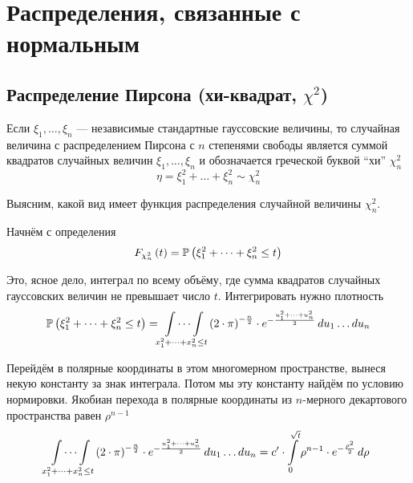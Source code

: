 \section{Распределения, связанные с нормальным}

\subsection{Распределение Пирсона (хи-квадрат, $\chi^2$)}

\begin{definition}
    Если $\xi_1, \dots, \xi_n$ --- независимые стандартные гауссовские величины,
    то случайная величина с распределением Пирсона с $n$ степенями свободы
    является суммой квадратов случайных величин $\xi_1, \dots, \xi_n$ и
    обозначается греческой буквой ``хи'' $\chi_n^2$
    $$\eta = \xi_1^2 + \dots + \xi_n^2 \sim \chi_n^2$$
\end{definition}

Выясним, какой вид имеет функция распределения случайной величины $\chi_n^2$.

Начнём с определения
\begin{align*}
    F_{\chi_n^2}\left(t\right)
    = \mathbb{P}\left( \xi_1^2 + \dots + \xi_n^2 \le t \right)
\end{align*}

Это, ясное дело, интеграл по всему объёму, где сумма квадратов случайных
гауссовских величин не превышает число $t$. Интегрировать нужно плотность
\begin{align*}
    \mathbb{P}\left( \xi_1^2 + \dots + \xi_n^2 \le t \right)
    = \idotsint\limits_{x_1^2 + \dots + x_n^2 \le t}
        \left( 2 \cdot \pi \right)^{- \frac{n}{2}}
        \cdot e^{- \frac{u_1^2 + \dots + u_n^2}{2}}
        \, du_1 \dots du_n
\end{align*}

Перейдём в полярные координаты в этом многомерном пространстве, вынеся некую
константу за знак интеграла. Потом мы эту константу найдём по условию
нормировки. Якобиан перехода в полярные координаты из $n$-мерного декартового
пространства равен $\rho^{n-1}$
\begin{align*}
    \idotsint\limits_{x_1^2 + \dots + x_n^2 \le t}
        \left( 2 \cdot \pi \right)^{- \frac{n}{2}}
        \cdot e^{- \frac{u_1^2 + \dots + u_n^2}{2}}
        \, du_1 \dots du_n
    = c' \cdot \int\limits_{0}^{\sqrt{t}} 
        \rho^{n-1} \cdot e^{- \frac{\rho^2}{2}} \, d \rho
\end{align*}

